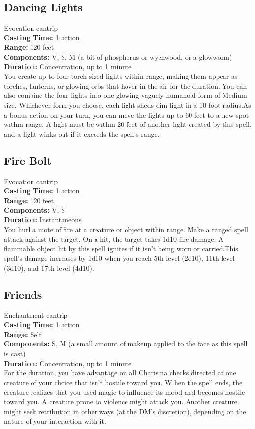 \documentclass[11pt, A4paper, english]{article}
\begin{document}
		\subsection{Dancing Lights}
Evocation cantrip \\
\textbf{Casting Time:} 1 action \\
\textbf{Range:} 120 feet \\
\textbf{Components:} V, S, M (a bit of phosphorus or wychwood, or a glowworm) \\
\textbf{Duration:} Concentration, up to  1  minute \\
You create up to four torch-sized lights within range, making them appear as torches, lanterns, or glowing orbs that hover in the air for the duration. You can also combine the four lights into one glowing vaguely humanoid form of Medium size. Whichever form you choose, each light sheds dim light in a  10-foot radius.As a bonus action on your turn, you can move the lights up to 60 feet to a new spot within range. A light must be within 20 feet of another light created by this spell, and a light winks out if it exceeds the spell’s range.

		\subsection{Fire Bolt}
Evocation cantrip \\
\textbf{Casting Time:} 1 action \\
\textbf{Range:} 120 feet \\
\textbf{Components:} V, S \\
\textbf{Duration:} Instantaneous \\
You hurl a mote of fire at a creature or object within range. Make a ranged spell attack against the target. On a hit, the target takes  1d10 fire damage. A flammable object hit by this spell ignites if it isn't being worn or carried.This spell’s damage increases by 1d10 when you reach 5th level (2d10), 11th level (3d10), and 17th level (4d10).

		\subsection{Friends}
Enchantment cantrip \\
\textbf{Casting Time:} 1 action \\
\textbf{Range:} Self \\
\textbf{Components:} S, M (a small amount of makeup applied to the face as this spell is cast) \\
\textbf{Duration:} Concentration, up to  1  minute \\
For the duration, you have advantage on all Charisma checks directed at one creature of your choice that isn't hostile toward you. W hen the spell ends, the creature realizes that you used magic to influence its mood and becomes hostile toward you. A creature prone to violence might attack you. Another creature might seek retribution in other ways (at the DM’s discretion), depending on the nature of your interaction with it.
\end{document}
